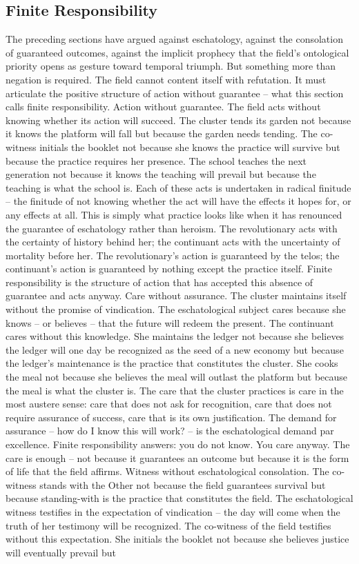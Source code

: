 \subsection{Finite Responsibility}

The preceding sections have argued against eschatology, against the consolation of guaranteed outcomes, against the implicit prophecy that the field’s ontological priority opens as gesture toward temporal triumph. But something more than negation is required. The field cannot content itself with refutation. It must articulate the positive structure of action without guarantee – what this section calls finite responsibility. Action without guarantee. The field acts without knowing whether its action will succeed. The cluster tends its garden not because it knows the platform will fall but because the garden needs tending. The co-witness initials the booklet not because she knows the practice will survive but because the practice requires her presence. The school teaches the next generation not because it knows the teaching will prevail but because the teaching is what the school is. Each of these acts is undertaken in radical finitude – the finitude of not knowing whether the act will have the effects it hopes for, or any effects at all. This is simply what practice looks like when it has renounced the guarantee of eschatology rather than heroism. The revolutionary acts with the certainty of history behind her; the continuant acts with the uncertainty of mortality before her. The revolutionary’s action is guaranteed by the telos; the continuant’s action is guaranteed by nothing except the practice itself. Finite responsibility is the structure of action that has accepted this absence of guarantee and acts anyway. Care without assurance. The cluster maintains itself without the promise of vindication. The eschatological subject cares because she knows – or believes – that the future will redeem the present. The continuant cares without this knowledge. She maintains the ledger not because she believes the ledger will one day be recognized as the seed of a new economy but because the ledger’s maintenance is the practice that constitutes the cluster. She cooks the meal not because she believes the meal will outlast the platform but because the meal is what the cluster is. The care that the cluster practices is care in the most austere sense: care that does not ask for recognition, care that does not require assurance of success, care that is its own justification. The demand for assurance – how do I know this will work? – is the eschatological demand par excellence. Finite responsibility answers: you do not know. You care anyway. The care is enough – not because it guarantees an outcome but because it is the form of life that the field affirms. Witness without eschatological consolation. The co-witness stands with the Other not because the field guarantees survival but because standing-with is the practice that constitutes the field. The eschatological witness testifies in the expectation of vindication – the day will come when the truth of her testimony will be recognized. The co-witness of the field testifies without this expectation. She initials the booklet not because she believes justice will eventually prevail but 